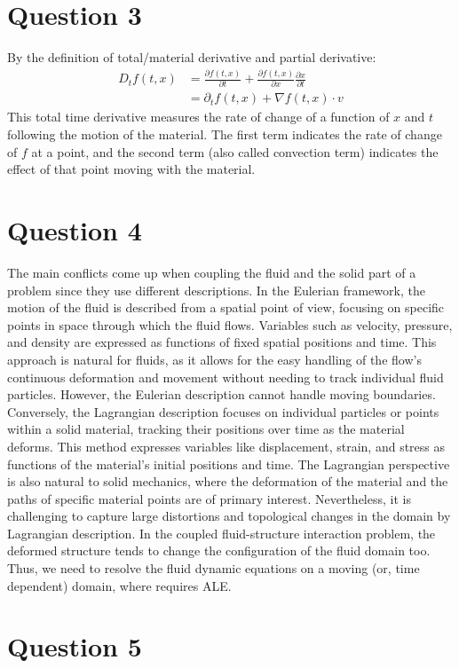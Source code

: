 \documentclass[a4paper,12pt]{article} %
\begin{document}
\section{\textbf{Question 3}}
By the definition of total/material derivative and partial derivative:
\begin{align*}
D_t f(t,x) &= \frac{\partial f(t,x)}{\partial t} + \frac{\partial f(t,x)}{\partial x}\frac{\partial x}{\partial t}\\
&= {\partial}_t f(t,x) + \nabla f(t,x) \cdot v
\end{align*}
This total time derivative measures the rate of change of a function of $x$ and $t$ following the motion of the material.
The first term indicates the rate of change of $f$ at a point, and the second term (also called convection term) indicates
the effect of that point moving with the material.

\newpage
\section{\textbf{Question 4}}
The main conflicts come up when coupling the fluid and the solid part of a problem since they use different descriptions.
In the Eulerian framework, the motion of the fluid is described from a spatial point of view, focusing on specific points 
in space through which the fluid flows. Variables such as velocity, pressure, and density are expressed as functions of 
fixed spatial positions and time. This approach is natural for fluids, as it allows for the easy handling of the flow's 
continuous deformation and movement without needing to track individual fluid particles. However, the
Eulerian description cannot handle moving boundaries. 
Conversely, the Lagrangian description focuses on individual particles or points within a solid material, tracking their 
positions over time as the material deforms. This method expresses variables like displacement, strain, and stress as 
functions of the material's initial positions and time. The Lagrangian perspective is also natural to solid mechanics, 
where the deformation of the material and the paths of specific material points are of primary interest.
Nevertheless, it is challenging to capture large distortions and topological changes in the domain by Lagrangian description.
In the coupled fluid-structure interaction problem, the deformed structure tends to change
the configuration of the fluid domain too. Thus, we need to resolve the fluid dynamic
equations on a moving (or, time dependent) domain, where requires ALE.

\newpage
\section{\textbf{Question 5}}
\end{document}
